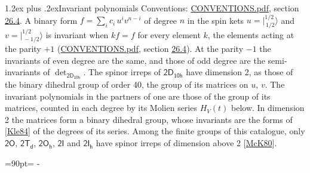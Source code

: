 \documentclass[10pt,a4paper]{article}
\makeatletter
\renewcommand\section{\@startsection{section}{1}{\z@}{-3ex plus -1ex minus -.2ex}%
  {1.2ex plus .2ex}{\normalfont\large\sffamily\bfseries\color{parttitle}}}
\newcommand{\needspace}[1]{\par\penalty-100\begingroup\dimen0=#1\relax\dimen2=\pagegoal
  \advance\dimen2-\pagetotal\ifdim\dimen0>\dimen2\relax\ifdim\dimen2>0pt\vfil\break\fi\fi
  \endgroup}
\numberwithin{equation}{section}
\newcommand{\grp}[1]{\mathsf{#1}}
\newcommand{\jm}[2]{\bigl\lvert{}^{#1}_{\,#2}\bigr\rangle}
\makeatother
\begin{document}
\section{Invariant polynomials}\label{s:invariants}
Conventions: \href{../../CONVENTIONS.pdf}{CONVENTIONS.pdf}, section \href{../../CONVENTIONS.pdf\#conv.26.4}{26.4}.
\leavevmode\label{n:local.binary.form}A binary form $f = \sum_i c_i\, u^i v^{n-i}$ of degree $n$ in the spin kets $u = \jm{1/2}{1/2}$ and $v = \jm{1/2}{-1/2}$ is invariant when $k f = f$ for every element $k$, the elements acting at the parity $+1$ (\href{../../CONVENTIONS.pdf}{CONVENTIONS.pdf}, section \href{../../CONVENTIONS.pdf\#conv.26.4}{26.4}). At the parity $-1$ the invariants of even degree are the same, and those of odd degree are the semi-invariants of $\det_{\grp{2D_{10h}}}$.
The spinor irreps of $\grp{2D_{10h}}$ have dimension 2, as those of the binary dihedral group of order 40, the group of its matrices on $u$, $v$. \label{n:function.hilbert}The invariant polynomials in the partners of one are those of the group of its matrices, counted in each degree by its Molien series $H_V(t)$ below. In dimension 2 the matrices form a binary dihedral group, whose invariants are the forms of [\href{../../../REFERENCES.pdf\#ref.Kle84}{Kle84}] of the degrees of its series. Among the finite groups of this catalogue, only $\grp{2O}$, $\grp{2T_{d}}$, $\grp{2O_{h}}$, $\grp{2I}$ and $\grp{2I_{h}}$ have spinor irreps of dimension above 2 [\href{../../../REFERENCES.pdf\#ref.McK80}{McK80}].
\needspace{90pt}
\end{document}
